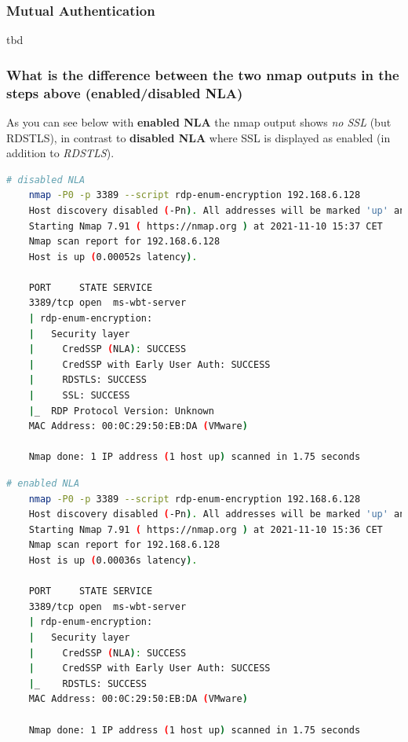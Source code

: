 \subsubsection{Mutual Authentication}
tbd

\subsubsection{What is the difference between the two nmap outputs in the steps above (enabled/disabled NLA)}
As you can see below with \textbf{enabled NLA} the nmap output shows \textit{no SSL} (but RDSTLS), in contrast to \textbf{disabled NLA} where SSL is displayed as enabled (in addition to \textit{RDSTLS}).

\begin{lstlisting}[language=bash]
    # disabled NLA
    nmap -P0 -p 3389 --script rdp-enum-encryption 192.168.6.128
    Host discovery disabled (-Pn). All addresses will be marked 'up' and scan times will be slower.
    Starting Nmap 7.91 ( https://nmap.org ) at 2021-11-10 15:37 CET
    Nmap scan report for 192.168.6.128
    Host is up (0.00052s latency).

    PORT     STATE SERVICE
    3389/tcp open  ms-wbt-server
    | rdp-enum-encryption:
    |   Security layer
    |     CredSSP (NLA): SUCCESS
    |     CredSSP with Early User Auth: SUCCESS
    |     RDSTLS: SUCCESS
    |     SSL: SUCCESS
    |_  RDP Protocol Version: Unknown
    MAC Address: 00:0C:29:50:EB:DA (VMware)

    Nmap done: 1 IP address (1 host up) scanned in 1.75 seconds
\end{lstlisting}

\begin{lstlisting}[language=bash]
    # enabled NLA
    nmap -P0 -p 3389 --script rdp-enum-encryption 192.168.6.128
    Host discovery disabled (-Pn). All addresses will be marked 'up' and scan times will be slower.
    Starting Nmap 7.91 ( https://nmap.org ) at 2021-11-10 15:36 CET
    Nmap scan report for 192.168.6.128
    Host is up (0.00036s latency).

    PORT     STATE SERVICE
    3389/tcp open  ms-wbt-server
    | rdp-enum-encryption:
    |   Security layer
    |     CredSSP (NLA): SUCCESS
    |     CredSSP with Early User Auth: SUCCESS
    |_    RDSTLS: SUCCESS
    MAC Address: 00:0C:29:50:EB:DA (VMware)

    Nmap done: 1 IP address (1 host up) scanned in 1.75 seconds
\end{lstlisting}


